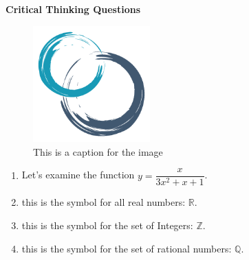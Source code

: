\documentclass[10pt, letterpaper]{article}
\def\eq1{y=\dfrac{x}{3x^2+x+1}}
\newcommand{\set}[1]{\setlength\itemsep{#1 em}}
\begin{document}
 
 
\textbf{Critical Thinking Questions}

\begin{figure}[H]
\centering
\includegraphics[width=0.4\textwidth]{logo-250}
\caption{This is a caption for the image}
\end{figure}

\begin{enumerate}

\set{1.2}

\item Let's examine the function $\eq1$.

\item this is the symbol for all real numbers: $\mathbb{R}$.

\item this is the symbol for the set of Integers: $\mathbb{Z}$.

\item this is the symbol for the set of rational numbers: $\mathbb{Q}$.




\end{enumerate}
\end{document}
